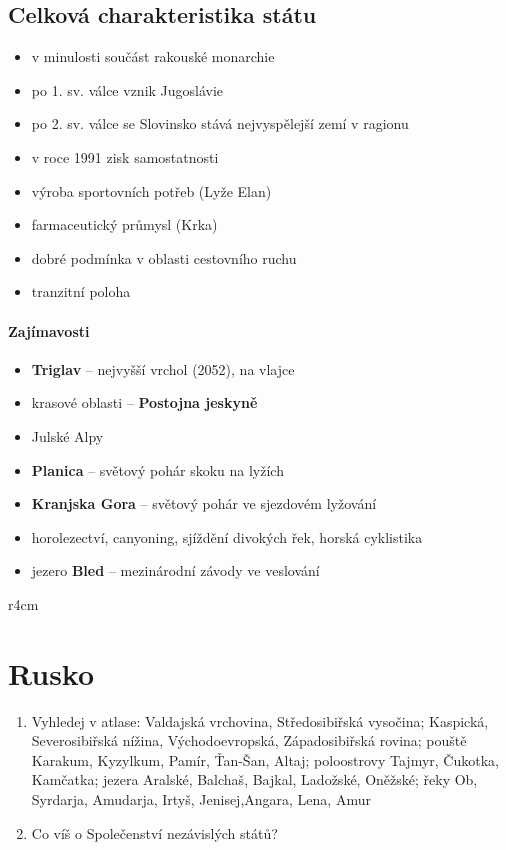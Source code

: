 \subsection{Celková charakteristika státu}
\begin{itemize}
\item v minulosti součást rakouské monarchie
\item po 1. sv. válce vznik Jugoslávie
\item po 2. sv. válce se Slovinsko stává nejvyspělejší zemí v ragionu
\item v roce 1991 zisk samostatnosti
\item výroba sportovních potřeb (Lyže Elan)
\item farmaceutický průmysl (Krka)
\item dobré podmínka v oblasti cestovního ruchu
\item tranzitní poloha
\end{itemize}

\paragraph{Zajímavosti}
\begin{itemize}
\item \textbf{Triglav} -- nejvyšší vrchol (2052), na vlajce 
\item krasové oblasti -- \textbf{Postojna jeskyně}
\item Julské Alpy
\item \textbf{Planica} -- světový pohár skoku na lyžích
\item \textbf{Kranjska Gora} -- světový pohár ve sjezdovém lyžování
\item horolezectví, canyoning, sjíždění divokých řek, horská cyklistika
\item jezero \textbf{Bled} -- mezinárodní závody ve veslování
\end{itemize}



\newpage
\mbox{}
\vspace{-1.5cm}
\begin{wrapfigure}{r}{4cm}
\vspace{-20pt}
\end{wrapfigure}	
\section{Rusko}
\begin{enumerate}
\item Vyhledej v atlase: Valdajská vrchovina, Středosibiřská vysočina; Kaspická, Severosibiřská nížina, Východoevropská, Západosibiřská rovina; pouště Karakum, Kyzylkum, Pamír, Ťan-Šan, Altaj; poloostrovy Tajmyr, Čukotka, Kamčatka; jezera Aralské, Balchaš, Bajkal, Ladožské, Oněžské; řeky Ob, Syrdarja, Amudarja, Irtyš, Jenisej,Angara, Lena, Amur
\item Co víš o Společenství nezávislých států?
\end{enumerate}



